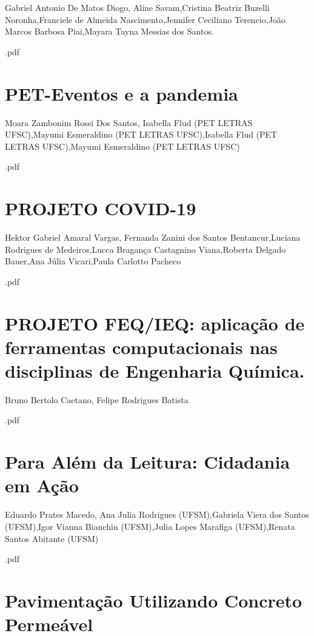 Gabriel Antonio De Matos Diogo, Aline Savam,Cristina Beatriz Buzelli Noronha,Franciele de Almeida Nascimento,Jennifer Ceciliano Terencio,João Marcos Barbosa Piai,Mayara Tayna Messias dos Santos.



.pdf\section{PET-Eventos e a pandemia}

Moara Zambonim Rossi Dos Santos, Isabella Flud (PET LETRAS UFSC),Mayumi Esmeraldino (PET LETRAS UFSC),Isabella Flud (PET LETRAS UFSC),Mayumi Esmeraldino (PET LETRAS UFSC)



.pdf\section{PROJETO COVID-19}

Hektor Gabriel Amaral Vargas, Fernanda Zanini dos Santos Bentancur,Luciana Rodrigues de Medeiros,Lucca Bragança Castagnino Viana,Roberta Delgado Bauer,Ana Júlia Vicari,Paula Carlotto Pacheco



.pdf\section{PROJETO FEQ/IEQ: aplicação de ferramentas computacionais nas disciplinas de Engenharia Química.}

Bruno Bertolo Caetano, Felipe Rodrigues Batista



.pdf\section{Para Além da Leitura: Cidadania em Ação}

Eduardo Prates Macedo, Ana Julia Rodrigues (UFSM),Gabriela Viera dos Santos (UFSM),Igor Vianna Bianchin (UFSM),Julia Lopes Marafiga (UFSM),Renata Santos Abitante (UFSM)



.pdf\section{Pavimentação Utilizando Concreto Permeável}

